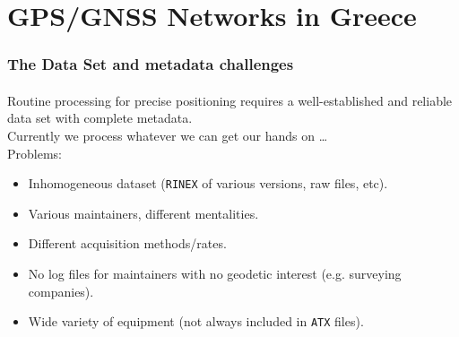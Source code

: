 \section{GPS/GNSS Networks in Greece}
\begin{frame}\frametitle{The Data Set and metadata challenges}\framesubtitle{}
\vskip-1.5cm
  Routine processing for precise positioning requires a well-established and reliable data set with complete metadata. \\
  \bigskip
  Currently we process whatever we can get our hands on \ldots\\
  Problems:
  \begin{itemize}
    \item Inhomogeneous dataset (\texttt{RINEX} of various versions, raw files, etc).
    \item Various maintainers, different mentalities.
    \item Different acquisition methods/rates.
    \item No log files for maintainers with no geodetic interest (e.g. surveying companies).
    \item Wide variety of equipment (not always included in \texttt{ATX} files).
  \end{itemize}
\end{frame}
\note

